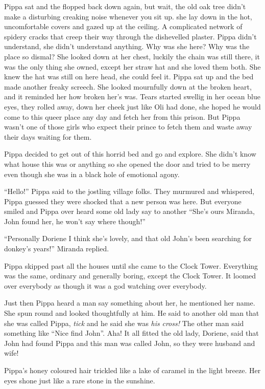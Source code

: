 Pippa sat and the flopped back down again, but wait, the old oak tree
didn't make a disturbing creaking noise whenever you sit up. she lay
down in the hot, uncomfortable covers and gazed up at the ceiling. A
complicated network of spidery cracks that creep their way through the
dishevelled plaster. Pippa didn't understand, she didn't understand
anything. Why was she here? Why was the place so dismal? She looked down
at her chest, luckily the chain was still there, it was the only thing
she owned, except her straw hat and she loved them both. She knew the
hat was still on here head, she could feel it. Pippa sat up and the bed
made another freaky screech. She looked mournfully down at the broken
heart, and it reminded her how broken her's was. Tears started swellig
in her ocean blue eyes, they rolled away, down her cheek just like Oli
had done, she hoped he would come to this queer place any day and fetch
her from this prison. But Pippa wasn't one of those girls who expect
their prince to fetch them and waste away their days waiting for them.

Pippa decided to get out of this horrid bed and go and explore. She
didn't know what house this was or anything so she opened the door and
tried to be merry even though she was in a black hole of emotional
agony.

``Hello!'' Pippa said to the jostling village folks. They murmured and
whispered, Pippa guessed they were shocked that a new person was here.
But everyone smiled and Pippa over heard some old lady say to another
``She's ours Miranda, John found her, he won't say where though!''

``Personally Doriene I think she's lovely, and that old John's been
searching for donkey's years!'' Miranda replied.

Pippa skipped past all the houses until she came to the Clock Tower.
Everything was the same, ordinary and generally boring, except the Clock
Tower. It loomed over everybody as though it was a god watching over
everybody.

Just then Pippa heard a man say something about her, he mentioned her
name. She spun round and looked thoughtfully at him. He said to another
old man that she was called Pippa, \emph{tick} and he said she was
\emph{his} \emph{cross!} The other man said something like ``Nice find
John''. Aha! It all fitted the old lady, Doriene, said that John had
found Pippa and this man was called John, so they were husband and wife!

Pippa's honey coloured hair trickled like a lake of caramel in the light
breeze. Her eyes shone just like a rare stone in the sunshine.

